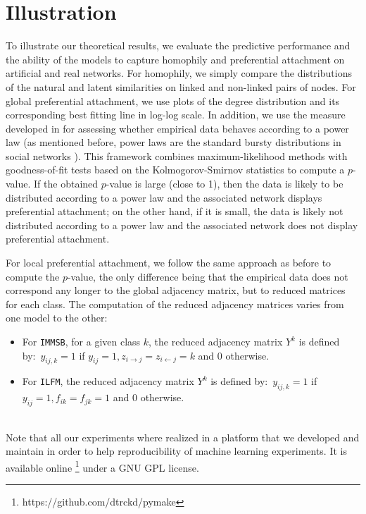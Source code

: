 \documentclass[journal]{IEEEtran}
\newcommand{\ifm}{\texttt{ILFM}}
\newcommand{\imb}{\texttt{IMMSB}}
\begin{document}
\section{Illustration}
\label{sec:exps}

To illustrate our theoretical results, we evaluate the predictive performance and the ability of the models to capture homophily and preferential attachment on artificial and real networks. For homophily, we simply compare the distributions of the natural and latent similarities on linked and non-linked pairs of nodes. For global preferential attachment, we use plots of the degree distribution and its corresponding best fitting line in log-log scale. In addition, we use the measure developed in \cite{clauset2009power} for assessing whether empirical data behaves according to a power law (as mentioned before, power laws are the standard bursty distributions in social networks \cite{barabasi1999emergence}). This framework combines maximum-likelihood methods with goodness-of-fit tests based on the Kolmogorov-Smirnov statistics to compute a $p$-value. If the obtained $p$-value is large (close to 1), then the data is likely to be distributed according to a power law and the associated network displays preferential attachment;  on the other hand, if it is small, the data is likely not distributed according to a power law and the associated network does not display preferential attachment.

For local preferential attachment, we follow the same approach as before to compute the $p$-value, the only difference being that the empirical data does not correspond any longer to the global adjacency matrix, but to reduced matrices for each class. The computation of the reduced adjacency matrices varies from one model to the other:
%
\begin{itemize}
    \item For \imb, for a given class $k$, the reduced adjacency matrix $Y^k$ is defined by:~$y_{ij,k}=1$ if $y_{ij}=1, z_{i\rightarrow j}=z_{i\leftarrow j}=k$ and $0$ otherwise.
    \item For \ifm, the reduced adjacency matrix $Y^k$ is defined by:~$ y_{ij,k}=1$ if $y_{ij}=1 , f_{ik}=f_{jk}=1$ and $0$ otherwise.
\end{itemize}~\\


Note that all our experiments where realized in a platform that we developed and maintain in order to help reproducibility of machine learning experiments. It is available online \footnote{https://github.com/dtrckd/pymake} under a GNU GPL license.
\end{document}
